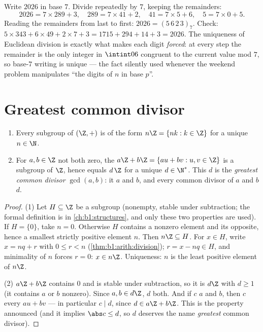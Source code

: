 \begin{example}\label{ex:b1:arith:base7}
Write $2026$ in base $7$. Divide repeatedly by $7$, keeping the
remainders:
\[
2026 = 7 \times 289 + 3, \quad
289 = 7 \times 41 + 2, \quad
41 = 7 \times 5 + 6, \quad
5 = 7 \times 0 + 5 .
\]
Reading the remainders from last to first: $2026 =
(5\,6\,2\,3)_7$. Check: $5 \times 343 + 6 \times 49 + 2 \times 7
+ 3 = 1715 + 294 + 14 + 3 = 2026$. The uniqueness of Euclidean
division is exactly what makes each digit \emph{forced}: at every
step the remainder is the only integer in $\intint06$ congruent
to the current value mod $7$, so base-$7$ writing is unique ---
the fact silently used whenever the weekend problem manipulates
``the digits of $n$ in base $p$''.
\end{example}

\section{Greatest common divisor}

\begin{theorem}\label{thm:b1:arith:gcd}
\begin{enumerate}
  \item Every subgroup of $(\Z, +)$ is of the form $n\Z = \{nk : k
        \in \Z\}$ for a unique $n \in \N$.
  \item For $a, b \in \Z$ not both zero, the  $a\Z + b\Z = \{au +
        bv : u, v \in \Z\}$ is a subgroup of $\Z$, hence equals
        $d\,\Z$ for a unique $d \in \N^*$. This $d$ is the
        \emph{greatest common divisor}
        $\gcd(a, b)$: it  $a$ and $b$, and every common
        divisor of $a$ and $b$  $d$.
\end{enumerate}
\end{theorem}

\begin{proof}
(1) Let $H \subseteq \Z$ be a subgroup (nonempty, stable under
subtraction; the formal definition is in \cref{ch:b1:structures},
and only these two properties are used). If $H = \{0\}$, take $n = 0$.
Otherwise $H$ contains a nonzero element and its opposite, hence a
smallest strictly positive element $n$. Then $n\Z \subseteq H$. For $x
\in H$, write $x = nq + r$ with $0 \leq r < n$
(\cref{thm:b1:arith:division}); $r = x - nq \in H$, and minimality of
$n$ forces $r = 0$: $x \in n\Z$. Uniqueness: $n$ is the least positive
element of $n\Z$.

(2) $a\Z + b\Z$ contains $0$ and is stable under subtraction, so it is
$d\Z$ with $d \geq 1$ (it contains $a$ or $b$ nonzero). Since $a, b
\in d\Z$, $d$  both. And if $c$  $a$ and $b$, then $c$
 every $au + bv$ --- in particular $c \mid d$, since $d \in a\Z
+ b\Z$. This is the property announced (and it implies $\abs c \leq
d$, so $d$ deserves the name \emph{greatest} common divisor).
\end{proof}

